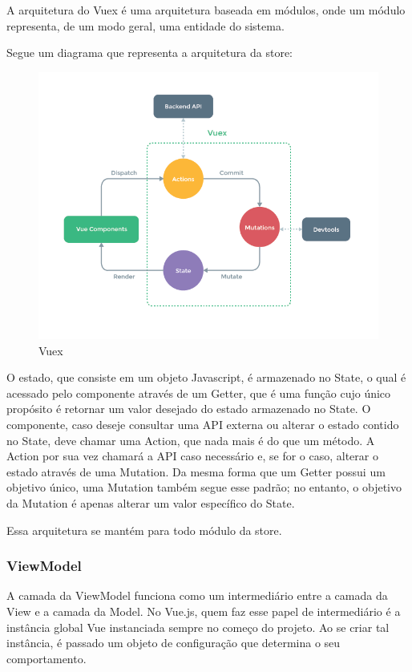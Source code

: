 \begin{apendicesenv}
A arquitetura do Vuex é uma arquitetura baseada em módulos, onde um módulo representa, de um modo geral, uma entidade do sistema.

Segue um diagrama que representa a arquitetura da store:

\begin{figure}[!ht]
	\centering
		\includegraphics[scale=0.5]{figuras/software/7-vuex.png}
	\caption{Vuex}
\end{figure}

O estado, que consiste em um objeto Javascript, é armazenado no State, o qual é acessado pelo componente através de um Getter, que é uma função cujo único propósito é retornar um valor desejado do estado armazenado no State. O componente, caso deseje consultar uma API externa ou alterar o estado contido no State, deve chamar uma Action, que nada mais é do que um método. A Action por sua vez chamará a API caso necessário e, se for o caso, alterar o estado através de uma Mutation. Da mesma forma que um Getter possui um objetivo único, uma Mutation também segue esse padrão; no entanto, o objetivo da Mutation é apenas alterar um valor específico do State. 

Essa arquitetura se mantém para todo módulo da store. \cite{vuex}

\subsubsection{ViewModel}
A camada da ViewModel funciona como um intermediário entre a camada da View e a camada da Model. No Vue.js, quem faz esse papel de intermediário é a instância global Vue instanciada sempre no começo do projeto. Ao se criar tal instância, é passado um objeto de configuração que determina o seu comportamento.


\end{apendicesenv}
